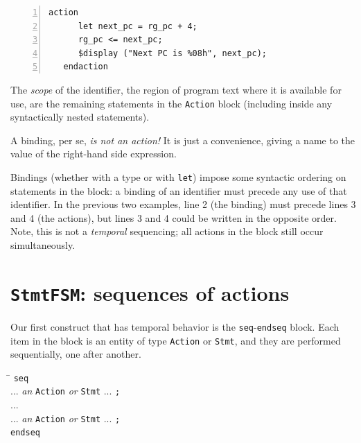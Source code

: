 {\footnotesize
\begin{Verbatim}[frame=single, numbers=left]
   action
      let next_pc = rg_pc + 4;
      rg_pc <= next_pc;
      $display ("Next PC is %08h", next_pc);
   endaction
\end{Verbatim}
}

The \emph{scope} of the identifier, {\ie} the region of program text
where it is available for use, are the remaining statements in the
{\tt Action} block (including inside any syntactically nested
statements).

A binding, per se, \emph{is not an action!}  It is just a convenience,
giving a name to the value of the right-hand side expression.

Bindings (whether with a type or with \verb|let|) impose some
syntactic ordering on statements in the block: a binding of an
identifier must precede any use of that identifier.  In the previous
two examples, line 2 (the binding) must precede lines 3 and 4 (the
actions), but lines 3 and 4 could be written in the opposite order.
Note, this is not a \emph{temporal} sequencing; all actions in the
block still occur simultaneously.


\section{{\tt StmtFSM}: sequences of actions}


Our first construct that has temporal behavior is the
\verb|seq|-\verb|endseq| block.  Each item in the block is an entity
of type \verb|Action| or \verb|Stmt|, and they are performed
sequentially, one after another.

\begin{tabbing}
\hmm \= \hm \kill
\hmm \> {\tt seq} \\
     \> \hm    ... \emph{an} {\tt Action} \emph{or} {\tt Stmt} ... {\tt ;} \\
     \> \hm    ... \\
     \> \hm    ... \emph{an} {\tt Action} \emph{or} {\tt Stmt} ... {\tt ;} \\
     \> {\tt endseq}
\end{tabbing}


